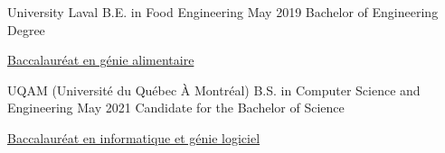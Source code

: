 

\begin{cventries}

  \cventry
    {University Laval} %
    {B.E. in Food Engineering} %
    {May 2019} %
    {Bachelor of Engineering Degree} %
    {
      \begin{cvitems} %
      \item{\href{https://www.ulaval.ca/les-etudes/programmes/repertoire/details/baccalaureat-en-genie-alimentaire-b-ing.html}
                {Baccalauréat en génie alimentaire}}
      \end{cvitems}
    }

  \cventry
    {UQAM (Université du Québec À Montréal)} %
    {B.S. in Computer Science and Engineering} %
    {May 2021} %
    {Candidate for the Bachelor of Science} %
    {
      \begin{cvitems} %
      \item{\href{https://etudier.uqam.ca/programme?code=7416}
           {Baccalauréat en informatique et génie logiciel}}
      \end{cvitems}
    }

\end{cventries}
